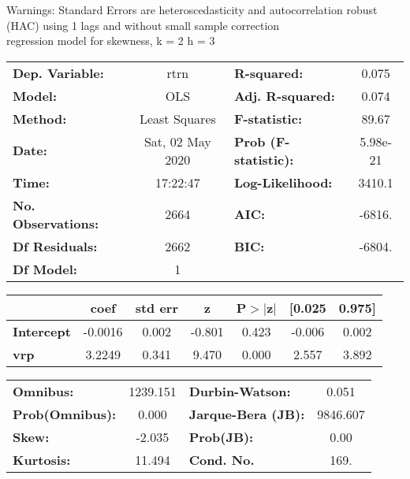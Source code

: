 Warnings: \newline
 [1] Standard Errors are heteroscedasticity and autocorrelation robust (HAC) using 1 lags and without small sample correction\\ 

regression model for skewness, k = 2 h = 3\begin{center}
\begin{tabular}{lclc}
\toprule
\textbf{Dep. Variable:}    &       rtrn       & \textbf{  R-squared:         } &     0.075   \\
\textbf{Model:}            &       OLS        & \textbf{  Adj. R-squared:    } &     0.074   \\
\textbf{Method:}           &  Least Squares   & \textbf{  F-statistic:       } &     89.67   \\
\textbf{Date:}             & Sat, 02 May 2020 & \textbf{  Prob (F-statistic):} &  5.98e-21   \\
\textbf{Time:}             &     17:22:47     & \textbf{  Log-Likelihood:    } &    3410.1   \\
\textbf{No. Observations:} &        2664      & \textbf{  AIC:               } &    -6816.   \\
\textbf{Df Residuals:}     &        2662      & \textbf{  BIC:               } &    -6804.   \\
\textbf{Df Model:}         &           1      & \textbf{                     } &             \\
\bottomrule
\end{tabular}
\begin{tabular}{lcccccc}
                   & \textbf{coef} & \textbf{std err} & \textbf{z} & \textbf{P$> |$z$|$} & \textbf{[0.025} & \textbf{0.975]}  \\
\midrule
\textbf{Intercept} &      -0.0016  &        0.002     &    -0.801  &         0.423        &       -0.006    &        0.002     \\
\textbf{vrp}       &       3.2249  &        0.341     &     9.470  &         0.000        &        2.557    &        3.892     \\
\bottomrule
\end{tabular}
\begin{tabular}{lclc}
\textbf{Omnibus:}       & 1239.151 & \textbf{  Durbin-Watson:     } &    0.051  \\
\textbf{Prob(Omnibus):} &   0.000  & \textbf{  Jarque-Bera (JB):  } & 9846.607  \\
\textbf{Skew:}          &  -2.035  & \textbf{  Prob(JB):          } &     0.00  \\
\textbf{Kurtosis:}      &  11.494  & \textbf{  Cond. No.          } &     169.  \\
\bottomrule
\end{tabular}
\end{center}

